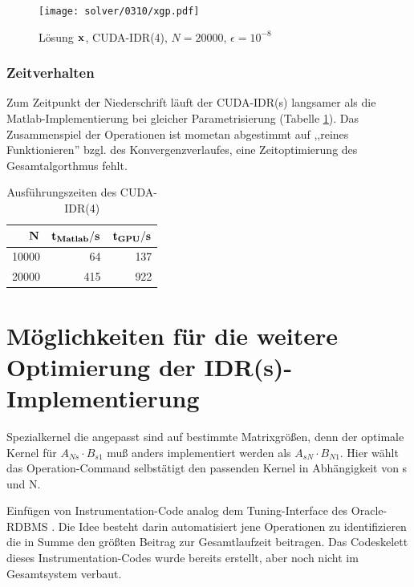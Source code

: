 \documentclass[journal]{IEEEtran}
\begin{document}
\begin{figure}[htbp]

   \texttt{[image: solver/0310/xgp.pdf]}

   \caption{ \label{solutionx} Lösung $\bf{x}$, CUDA-IDR(4), $N=20000$, $ \epsilon = 10^{-8}$  }%

\end{figure}

\subsubsection{Zeitverhalten}

Zum Zeitpunkt der Niederschrift läuft der CUDA-IDR(s) langsamer als
die Matlab-Implementierung bei gleicher Parametrisierung (Tabelle \ref{idrstimiing}).
Das Zusammenspiel der Operationen ist mometan abgestimmt auf ,,reines Funktionieren''
bzgl. des Konvergenzverlaufes, eine Zeitoptimierung des Gesamtalgorthmus fehlt.


\begin{table}[h]
\renewcommand{\arraystretch}{1.3}
\caption{Ausführungszeiten des CUDA-IDR(4)}
\label{idrstimiing}
\centering
\begin{tabular}{|r||r|r|}
\hline
\bfseries $ \bf N$ & \bfseries{ $ \bf t_{Matlab} / s $ } &  $ \bf t_{GPU} / s$  \\

\hline\hline
10000 & 64  &  137 \\

\hline

20000 & 415 & 922  \\



\hline
\end{tabular}
\end{table}

\section{Möglichkeiten für die weitere Optimierung der IDR(s)-Implementierung}

\begin{itemize}
 \begin{item}
Spezialkernel die angepasst
sind auf bestimmte Matrixgrößen, denn der optimale Kernel für
 $A_{Ns} \cdot B_{s1}$ muß anders implementiert werden als  $A_{sN} \cdot B_{N1}$.
Hier wählt das Operation-Command selbstätigt den passenden Kernel in Abhängigkeit
von s und N.
 \end{item}

\begin{item}

Einfügen von Instrumentation-Code analog dem Tuning-Interface des Oracle-RDBMS \cite{oracle}. Die Idee besteht darin
automatisiert jene Operationen zu identifizieren die in Summe den größten
Beitrag zur Gesamtlaufzeit beitragen.
Das Codeskelett dieses Instrumentation-Codes wurde bereits erstellt,
aber noch nicht im Gesamtsystem verbaut.
\end{item}


\end{itemize}
\end{document}

